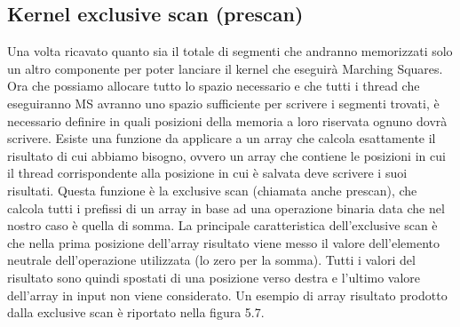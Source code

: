 \documentclass[12pt,a4paper]{report}
\begin{document}
\subsection{Kernel exclusive scan (prescan)}
Una volta ricavato quanto sia il totale di segmenti che andranno memorizzati solo un altro componente per poter lanciare il kernel che eseguirà Marching Squares. \newline
Ora che possiamo allocare tutto lo spazio necessario e che tutti i thread che eseguiranno MS avranno uno spazio sufficiente per scrivere i segmenti trovati, è necessario definire in quali posizioni della memoria a loro riservata ognuno dovrà scrivere. \newline
Esiste una funzione da applicare a un array che calcola esattamente il risultato di cui abbiamo bisogno, ovvero un array che contiene le posizioni in cui il thread corrispondente alla posizione in cui è salvata deve scrivere i suoi risultati.
Questa funzione è la exclusive scan (chiamata anche prescan), che calcola tutti i prefissi di un array in base ad una operazione binaria data che nel nostro caso è quella di somma. \newline
La principale caratteristica dell'exclusive scan è che nella prima posizione dell'array risultato viene messo il valore dell'elemento neutrale dell'operazione utilizzata (lo zero per la somma). Tutti i valori del risultato sono quindi spostati di una posizione verso destra e l'ultimo valore dell'array in input non viene considerato. Un esempio di array risultato prodotto dalla exclusive scan è riportato nella figura 5.7.
\end{document}
